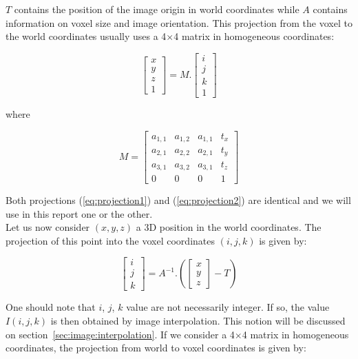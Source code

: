 $T$ contains the position of the image origin in world coordinates while $A$ contains information on voxel size and image orientation. This projection from the voxel to the world coordinates usually uses a 4$\times$4 matrix in homogeneous coordinates:

\begin{equation}
\begin{bmatrix} x \\ y \\ z \\ 1 \end{bmatrix}
=
M.
\begin{bmatrix} i \\ j \\ k \\ 1 \end{bmatrix}
\label{eq:projection2}
\end{equation}

where

\begin{equation}
M =
\begin{bmatrix}
a_{1,1} & a_{1,2} & a_{1,1} & t_x \\
a_{2,1} & a_{2,2} & a_{2,1} & t_y \\
a_{3,1} & a_{3,2} & a_{3,1} & t_z \\
0 & 0 & 0 & 1
\end{bmatrix}
\end{equation}

Both projections (\ref{eq:projection1}) and (\ref{eq:projection2}) are identical and we will use in this report one or the other.
\\

 
Let us now consider $(x,y,z)$ a 3D position in the world coordinates. The projection of this point into the voxel coordinates $(i,j,k)$ is given by:

\begin{equation}
\begin{bmatrix} i \\ j \\ k \end{bmatrix}
=
A^{-1}.
\left(
\begin{bmatrix} x \\ y \\ z \end{bmatrix}
- T
\right)
\end{equation}

One should note that $i$, $j$, $k$ value are not necessarily integer. If so, the value $I(i,j,k)$ is then obtained by image interpolation. This notion will be discussed on section~\ref{sec:image:interpolation}. If we consider a 4$\times$4 matrix in homogeneous coordinates, the projection from world to voxel coordinates is given by:


